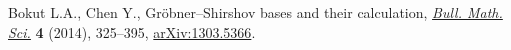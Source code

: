 Bokut L.A., Chen Y., Gr\"obner--{S}hirshov bases and their calculation,
 \href{https://doi.org/10.1007/s13373-014-0054-6}{\textit{Bull. Math. Sci.}} \textbf{4} (2014), 325--395, \href{https://arxiv.org/abs/1303.5366}{arXiv:1303.5366}.
